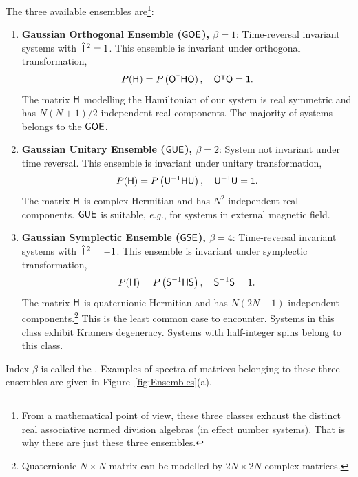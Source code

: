 \documentclass[a4paper,11pt,twoside]{article}
\begin{document}
    The three available ensembles are\footnote{
        From a mathematical point of view, these three classes exhaust the distinct real associative normed division algebras (in effect number systems).
        That is why there are just these three ensembles.
    }: 
    \begin{enumerate}
        \item {\bf Gaussian Orthogonal Ensemble ($\mathsf{GOE}$), $\beta=1$}: 
            Time-reversal invariant systems with $\mathsf{\hat{T}}^{2}=1$.
            This ensemble is invariant under orthogonal transformation,
            \begin{equation}\label{eq:PHInvariance}
                P(\mathsf{H})=P\left({\mathsf{O}}^{\intercal}\mathsf{H}\mathsf{O}\right),
                \quad{\mathsf{O}}^{\intercal}\mathsf{O}=\mathsf{1}.
            \end{equation}
            The matrix $\mathsf{H}$ modelling the Hamiltonian of our system is real symmetric and has $N(N+1)/2$ independent real components.
            The majority of systems belongs to the $\mathsf{GOE}$.

        \item {\bf Gaussian Unitary Ensemble ($\mathsf{GUE}$), $\beta=2$}: 
            System not invariant under time reversal.
            This ensemble is invariant under unitary transformation,
            \begin{equation}
                P(\mathsf{H})=P\left(\mathsf{U}^{-1}\mathsf{H}\mathsf{U}\right),
                \quad\mathsf{U}^{-1}\mathsf{U}=\mathsf{1}.
            \end{equation}
            The matrix $\mathsf{H}$ is complex Hermitian and has $N^{2}$ independent real components.
            $\mathsf{GUE}$ is suitable, \emph{e.g.}, for systems in external magnetic field.
        
        \item {\bf Gaussian Symplectic Ensemble ($\mathsf{GSE}$), $\beta=4$}:
            Time-reversal invariant systems with $\mathsf{\hat{T}}^{2}=-1$.
            This ensemble is invariant under symplectic transformation,
            \begin{equation}
                P(\mathsf{H})=P\left(\mathsf{S}^{-1}\mathsf{H}\mathsf{S}\right),
                \quad\mathsf{S}^{-1}\mathsf{S}=\mathsf{1}.
            \end{equation}
            The matrix $\mathsf{H}$ is quaternionic Hermitian and has $N(2N-1)$ independent components.\footnote{Quaternionic $N\times N$ matrix can be modelled by $2N\times 2N$ complex matrices.}
            This is the least common case to encounter.
            Systems in this class exhibit Kramers degeneracy.
            Systems with half-integer spins belong to this class. 
    \end{enumerate} 
    Index $\beta$ is called the .
    Examples of spectra of matrices belonging to these three ensembles are given in Figure~\ref{fig:Ensembles}(a). 
\end{document}
